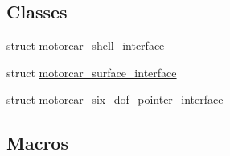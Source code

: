 \subsection*{Classes}
\begin{DoxyCompactItemize}
\item 
struct \hyperlink{structmotorcar__shell__interface}{motorcar\-\_\-shell\-\_\-interface}
\item 
struct \hyperlink{structmotorcar__surface__interface}{motorcar\-\_\-surface\-\_\-interface}
\item 
struct \hyperlink{structmotorcar__six__dof__pointer__interface}{motorcar\-\_\-six\-\_\-dof\-\_\-pointer\-\_\-interface}
\end{DoxyCompactItemize}
\subsection*{Macros}
